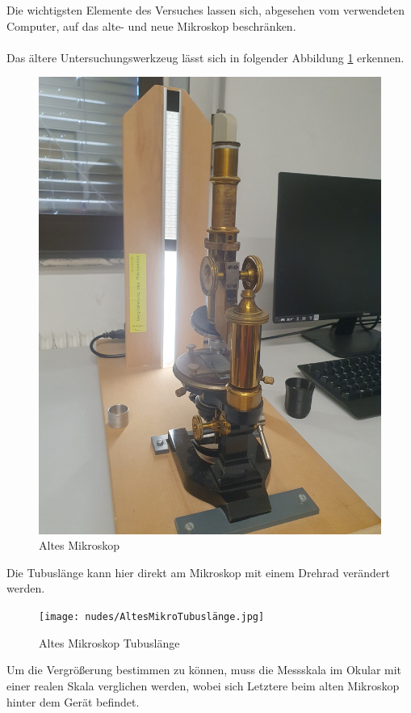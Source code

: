 \documentclass[12pt,a4paper,twoside]{article}
\begin{document}
    Die wichtigsten Elemente des Versuches lassen sich, abgesehen vom verwendeten Computer, auf das alte- und neue Mikroskop beschränken.
    \\
    \\
    Das ältere Untersuchungswerkzeug lässt sich in folgender Abbildung \ref{fig:Altes Mikroskop} erkennen.  

    \begin{figure}[H]
        \centering
        \includegraphics[width=0.5\linewidth, angle=-90]{nudes/AltesMikro.jpg}
        \caption{Altes Mikroskop}
        \label{fig:Altes Mikroskop}
    \end{figure}

    \noindent
    Die Tubuslänge kann hier direkt am Mikroskop mit einem Drehrad verändert werden.
    
    \begin{figure}[H]
        \centering
        \texttt{[image: nudes/AltesMikroTubuslänge.jpg]}
        \caption{Altes Mikroskop Tubuslänge}
        \label{fig:Altes Mikroskop Tubuslänge}
    \end{figure}

    \noindent
    Um die Vergrößerung bestimmen zu können, muss die Messskala im Okular mit einer realen Skala verglichen werden, wobei sich Letztere beim alten Mikroskop hinter dem Gerät befindet.
\end{document}
